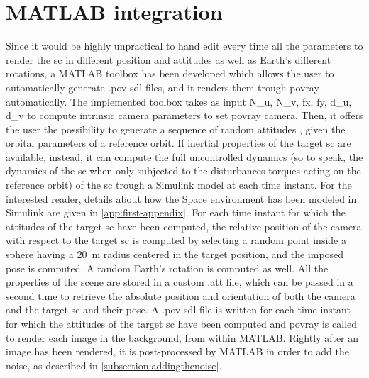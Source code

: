 \section{MATLAB integration}
Since it would be highly unpractical to hand edit every time all the parameters to render the \acrshort{sc} in different position and attitudes as well as Earth's different rotations, a MATLAB toolbox has been developed which allows the user to automatically generate .pov \acrshort{sdl} files, and it renders them trough \acrshort{povray} automatically.
The implemented toolbox takes as input \gls{N_u}, \gls{N_v}, \gls{fx}, \gls{fy}, \gls{d_u}, \gls{d_v} to compute intrinsic camera parameters to set \acrshort{povray} camera.
Then, it offers the user the possibility to generate a sequence of random attitudes \cite{Arvo92}, given the orbital parameters of a reference orbit. If inertial properties of the target \acrshort{sc} are available, instead, it can compute the full uncontrolled dynamics (so to speak, the dynamics of the \acrshort{sc} when only subjected to the disturbances torques acting on the reference orbit) of the \acrshort{sc} trough a Simulink model at each time instant. For the interested reader, details about how the Space environment has been modeled in Simulink are given in \ref{app:first-appendix}.
For each time instant for which the attitudes of the target \acrshort{sc} have been computed, the relative position of the camera with respect to the target \acrshort{sc} is computed by selecting a random point inside a sphere having a \SI{20}{\m} radius centered in the target position, and the imposed pose is computed. A random Earth's rotation is computed as well.
All the properties of the scene are stored in a custom .att file, which can be passed in a second time to retrieve the absolute position and orientation of both the camera and the target \acrshort{sc} and their pose.
A .pov \acrshort{sdl} file is written for each time instant for which the attitudes of the target \acrshort{sc} have been computed and \acrshort{povray} is called to render each image in the background, from within MATLAB. Rightly after an image has been rendered, it is post-processed by MATLAB in order to add the noise, as described in \ref{subsection:addingthenoise}.

